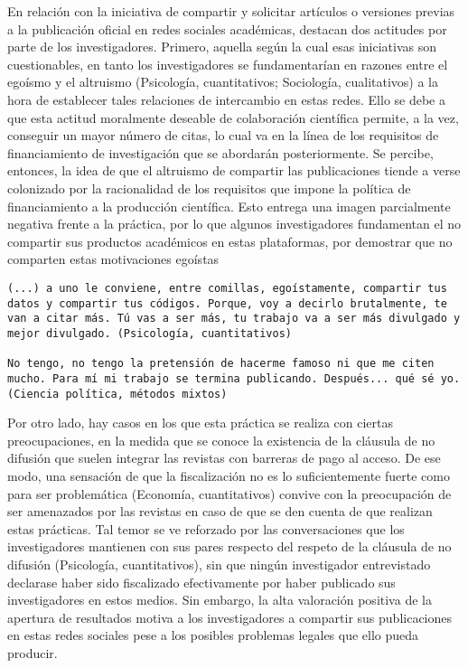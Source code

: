 \documentclass[
  letterpaper,
  DIV=11,
  numbers=noendperiod]{scrreprt}
\begin{document}
En relación con la iniciativa de compartir y solicitar artículos o
versiones previas a la publicación oficial en redes sociales académicas,
destacan dos actitudes por parte de los investigadores. Primero, aquella
según la cual esas iniciativas son cuestionables, en tanto los
investigadores se fundamentarían en razones entre el egoísmo y el
altruismo (Psicología, cuantitativos; Sociología, cualitativos) a la
hora de establecer tales relaciones de intercambio en estas redes. Ello
se debe a que esta actitud moralmente deseable de colaboración
científica permite, a la vez, conseguir un mayor número de citas, lo
cual va en la línea de los requisitos de financiamiento de investigación
que se abordarán posteriormente. Se percibe, entonces, la idea de que el
altruismo de compartir las publicaciones tiende a verse colonizado por
la racionalidad de los requisitos que impone la política de
financiamiento a la producción científica. Esto entrega una imagen
parcialmente negativa frente a la práctica, por lo que algunos
investigadores fundamentan el no compartir sus productos académicos en
estas plataformas, por demostrar que no comparten estas motivaciones
egoístas

\begin{verbatim}
(...) a uno le conviene, entre comillas, egoístamente, compartir tus datos y compartir tus códigos. Porque, voy a decirlo brutalmente, te van a citar más. Tú vas a ser más, tu trabajo va a ser más divulgado y mejor divulgado. (Psicología, cuantitativos)

No tengo, no tengo la pretensión de hacerme famoso ni que me citen mucho. Para mí mi trabajo se termina publicando. Después... qué sé yo. (Ciencia política, métodos mixtos)
\end{verbatim}

Por otro lado, hay casos en los que esta práctica se realiza con ciertas
preocupaciones, en la medida que se conoce la existencia de la cláusula
de no difusión que suelen integrar las revistas con barreras de pago al
acceso. De ese modo, una sensación de que la fiscalización no es lo
suficientemente fuerte como para ser problemática (Economía,
cuantitativos) convive con la preocupación de ser amenazados por las
revistas en caso de que se den cuenta de que realizan estas prácticas.
Tal temor se ve reforzado por las conversaciones que los investigadores
mantienen con sus pares respecto del respeto de la cláusula de no
difusión (Psicología, cuantitativos), sin que ningún investigador
entrevistado declarase haber sido fiscalizado efectivamente por haber
publicado sus investigadores en estos medios. Sin embargo, la alta
valoración positiva de la apertura de resultados motiva a los
investigadores a compartir sus publicaciones en estas redes sociales
pese a los posibles problemas legales que ello pueda producir.
\end{document}
